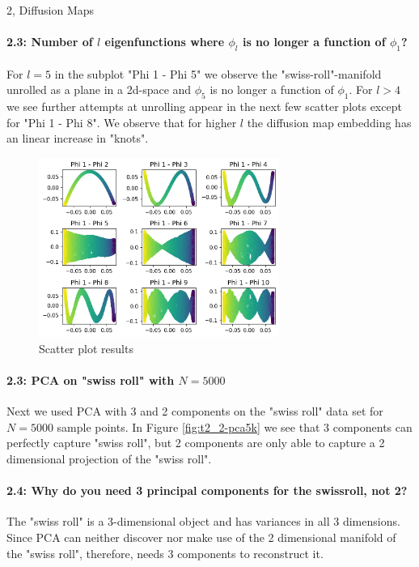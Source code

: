 \begin{task}{2, Diffusion Maps}
\paragraph{2.3: Number of $l$ eigenfunctions where $\phi_l$ is no longer a function of $\phi_1$?}
For $l=5$ in the subplot "Phi 1 - Phi 5" we observe the "swiss-roll"-manifold unrolled as a plane in a 2d-space and $\phi_5$ is no longer a function of $\phi_1$. For $l>4$ we see further attempts at unrolling appear in the next few scatter plots except for "Phi 1 - Phi 8". We observe that for higher $l$ the diffusion map embedding has an linear increase in "knots".
\begin{figure}[H]
\centering
\includegraphics[width=0.7\textwidth]{images_task2/t2_2-scatterplot5k.png}
\caption{Scatter plot results}
\label{fig:t2_2-phis5k}
\end{figure}

\paragraph{2.3: PCA on "swiss roll" with $N=5000$}
Next we used PCA with 3 and 2 components on the "swiss roll" data set for $N=5000$ sample points. In Figure \ref{fig:t2_2-pca5k} we see that 3 components can perfectly capture "swiss roll", but 2 components are only able to capture a 2 dimensional projection of the "swiss roll".

\paragraph{2.4: Why do you need 3 principal components for the swissroll, not 2?}
The "swiss roll" is a 3-dimensional object and has variances in all 3 dimensions. Since PCA can neither discover nor make use of the 2 dimensional manifold of the "swiss roll", therefore, needs 3 components to reconstruct it.


\end{task}
